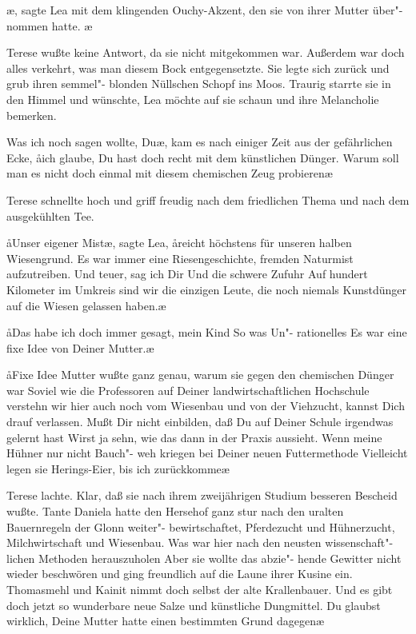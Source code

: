 \aanah{}\ae{}, sagte Lea mit dem
klingenden Ouchy-Akzent, den sie von ihrer Mutter über"-%
nommen hatte. \aanah{}\ae{}

Terese wußte keine Antwort, da sie nicht mitgekommen war.
Außerdem war doch alles verkehrt, was man diesem Bock
entgegensetzte. Sie legte sich zurück und grub ihren semmel"-%
blonden Nüllschen Schopf ins Moos. Traurig starrte sie in
den Himmel und wünschte, Lea möchte auf sie schaun und ihre
Melancholie bemerken.

\aanah{}Was ich noch sagen wollte, Du\ae{}, kam es nach einiger Zeit aus
der gefährlichen Ecke, \aa{}ich glaube, Du hast doch recht mit dem
künstlichen Dünger. Warum soll man es nicht doch einmal mit
diesem chemischen Zeug probieren\frag{}\ae{}

Terese schnellte hoch und griff freudig nach dem friedlichen
Thema und nach dem ausgekühlten Tee.

\aa{}Unser eigener Mist\ae{}, sagte Lea, \aa{}reicht höchstens für unseren
halben Wiesengrund. Es war immer eine Riesengeschichte,
fremden Naturmist aufzutreiben. Und teuer, sag ich Dir\ausr{}
Und die schwere Zufuhr\ausr{} Auf hundert Kilometer im Umkreis
sind wir die einzigen Leute, die noch niemals Kunstdünger
auf die Wiesen gelassen haben.\ae{}

\aa{}Das habe ich doch immer gesagt, mein Kind\ausr{} So was Un"-%
rationelles\ausr{} Es war eine fixe Idee von Deiner Mutter.\ae{}

\aa{}Fixe Idee\ausr{} Mutter wußte ganz genau, warum sie gegen
den chemischen Dünger war\ausr{} Soviel wie die Professoren auf
Deiner landwirtschaftlichen Hochschule verstehn wir hier
auch noch vom Wiesenbau und von der Viehzucht, kannst Dich
drauf verlassen. Mußt Dir nicht einbilden, daß Du auf Deiner
Schule irgendwas gelernt hast\ausr{} Wirst ja sehn, wie das dann
in der Praxis aussieht. Wenn meine Hühner nur nicht Bauch"-%
weh kriegen bei Deiner neuen Futtermethode\ausr{} Vielleicht
legen sie Herings-Eier, bis ich zurückkomme\frag{}\ae{}

Terese lachte. Klar, daß sie nach ihrem zweijährigen Studium
besseren Bescheid wußte. Tante Daniela hatte den Hersehof
ganz stur nach den uralten Bauernregeln der Glonn weiter"-%
bewirtschaftet, Pferdezucht und Hühnerzucht, Milchwirtschaft
und Wiesenbau. Was war hier nach den neusten wissenschaft"-%
lichen Methoden herauszuholen\ausr{} Aber sie wollte das abzie"-%
hende Gewitter nicht wieder beschwören und ging freundlich
auf die Laune ihrer Kusine ein. \aanah{}Thomasmehl und Kainit
nimmt doch selbst der alte Krallenbauer. Und es gibt doch
jetzt so wunderbare neue Salze und künstliche Dungmittel.
Du glaubst wirklich, Deine Mutter hatte einen bestimmten
Grund dagegen\frag{}\ae{}

